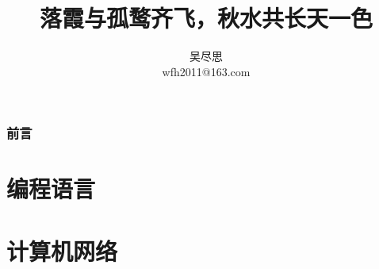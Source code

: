 \documentclass[
	paper = a4paper, 
	UTF8,
	oneside,
	zihao=-4, 
	linespread = 1.5, 
	heading = true,
]{ctexbook}
\title{落霞与孤鹜齐飞，秋水共长天一色}
\author{
	吴尽思 \\ wfh2011@163.com
}
\date{\zhtoday}
\begin{document}
\maketitle

\frontmatter
{}
\section*{前言}\label{sec:preface}


\tableofcontents
\listoffigures
\lstlistoflistings

\mainmatter
{}

\part{编程语言}




\part{计算机网络}
 \label{tcp-ip:ch12}


\printbibliography[title={参考文献}]
\end{document}

